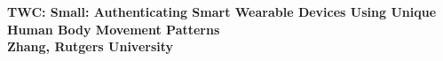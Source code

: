 \documentclass[10pt]{article}
\begin{document}
\setcounter{page}{1}
\def\mysection{A}
\nsffoot {}

\begin{center}
\vspace{-6mm}
{\bf TWC: Small: Authenticating Smart Wearable Devices Using Unique Human Body Movement Patterns\\ Zhang, Rutgers University\\}
\end{center}
\vspace*{-2mm}



\pagebreak




\setcounter{page}{1}
\def\mysection{C}
\nsffoot {}
\def\thesection{\arabic{section}}
\def\thesubsection{\arabic{section}.\arabic{subsection}}
\def\thesubsubsection{\arabic{section}.\arabic{subsection}.\arabic{subsubsection}}







%

\newpage

\setcounter{page}{1}
\def\mysection{D}


%
\end{document}
